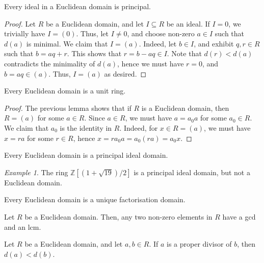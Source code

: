 \documentclass[11pt]{article}
\newcommand{\Z}{\mathbb{Z}}
\theoremstyle{definition}
\theoremstyle{remark}
\newtheorem*{example}{Example}
\numberwithin{equation}{section}
\begin{document}
    \begin{lemma}
        Every ideal in a Euclidean domain is principal.
    \end{lemma}
    \begin{proof}
        Let $R$ be a Euclidean domain, and let $I \subseteq R$ be an ideal. If $I =
        0$, we trivially have $I = (0)$. Thus, let $I \neq 0$, and choose non-zero $a
        \in I$ such that $d(a)$ is minimal. We claim that $I = (a)$. Indeed, let $b
        \in I$, and exhibit $q, r \in R$ such that $b = aq + r$. This
        shows that $r = b - aq \in I$. Note that $d(r) < d(a)$ contradicts the
        minimality of $d(a)$, hence we must have $r = 0$, and $b = aq \in (a)$. Thus,
        $I = (a)$ as desired.
    \end{proof}

    \begin{lemma}
        Every Euclidean domain is a unit ring.
    \end{lemma}
    \begin{proof}
        The previous lemma shows that if $R$ is a Euclidean domain, then $R = (a)$
        for some $a \in R$. Since $a \in R$, we must have $a = a_0a$ for some $a_0
        \in R$. We claim that $a_0$ is the identity in $R$. Indeed, for $x \in R =
        (a)$, we must have $x = ra$ for some $r \in R$, hence $x = ra_0a = a_0(ra) =
        a_0x$.
    \end{proof}

    \begin{theorem}
        Every Euclidean domain is a principal ideal domain.
    \end{theorem}
    \begin{example}
        The ring $\Z[(1 + \sqrt{19}) / 2]$ is a principal ideal domain, but not a
        Euclidean domain.
    \end{example}
    \begin{corollary}
        Every Euclidean domain is a unique factorisation domain.
    \end{corollary}
    \begin{corollary}
        Let $R$ be a Euclidean domain. Then, any two non-zero elements in $R$ have a
        gcd and an lcm.
    \end{corollary}

    \begin{lemma}
        Let $R$ be a Euclidean domain, and let $a, b \in R$. If $a$ is a proper
        divisor of $b$, then $d(a) < d(b)$.
    \end{lemma}
\end{document}
